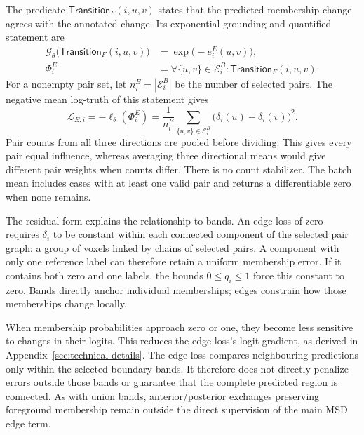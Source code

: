 \documentclass[12pt,a4paper]{article}
\begin{document}
The predicate $\mathsf{Transition}_F(i,u,v)$ states that the predicted
membership change agrees with the annotated change. Its exponential
grounding and quantified statement are
\begin{equation}
\begin{aligned}
\mathcal{G}_{\theta}\bigl(\mathsf{Transition}_{F}(i,u,v)\bigr)
 &=\exp\bigl(-e_i^E(u,v)\bigr),\\
\Phi_i^E
 &=\forall\{u,v\}\in\mathcal{E}_i^B:
     \mathsf{Transition}_{F}(i,u,v).
\end{aligned}
\label{eq:edge-logical-statement}
\end{equation}
For a nonempty pair set, let $n_i^E=|\mathcal E_i^B|$ be the number
of selected pairs. The negative mean log-truth of this statement gives
\begin{equation}
\mathcal{L}_{E,i}
=-\ell_{\theta}(\Phi_i^E)
=\frac{1}{n_i^E}\sum_{\{u,v\}\in\mathcal{E}_i^B}
   \bigl(\delta_i(u)-\delta_i(v)\bigr)^2.
\label{eq:edge-case-loss}
\end{equation}
Pair counts from all three directions
are pooled before dividing. This gives every pair equal influence,
whereas averaging three directional means would give different pair
weights when counts differ. There is no count stabilizer. The batch
mean includes cases with at least one valid pair and returns a
differentiable zero when none remains.

The residual form explains the relationship to bands. An edge loss of zero
requires $\delta_i$ to be constant within each connected component of the
selected pair graph: a group of voxels linked by chains of selected pairs. A
component with only one reference label can therefore retain a uniform
membership error. If it contains both zero and one labels, the bounds $0\leq
q_i\leq1$ force this constant to zero. Bands directly anchor individual
memberships; edges constrain how those memberships change locally.

When membership probabilities approach zero or one, they become less
sensitive to changes in their logits. This reduces the edge loss's logit
gradient, as derived in Appendix~\ref{sec:technical-details}. The edge loss
compares neighbouring predictions only within the selected boundary bands.
It therefore does not directly penalize errors outside those bands or
guarantee that the complete predicted region is connected. As with union
bands, anterior/posterior exchanges preserving foreground membership remain
outside the direct supervision of the main MSD edge term.
\end{document}
